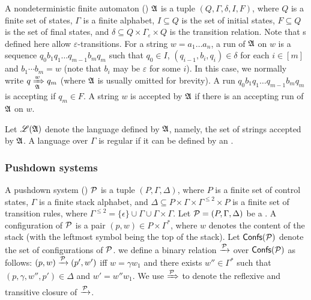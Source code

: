 
A nondeterministic finite automaton (\NFA) ${\mathfrak{A} }$ is a tuple $(Q, \Gamma, \delta, I, F)$, where $Q$ is a finite set of states, $\Gamma$ is a finite alphabet, $I \subseteq Q$ is the set of initial states, $F \subseteq Q$ is the set of final states, and $\delta \subseteq Q \times \Gamma_\varepsilon \times Q$ is the transition relation. Note that {\NFA}s defined here allow $\varepsilon$-transitions.
%
For a string $w = a_1 \dots a_n$, a run of ${\mathfrak{A} }$ on $w$ is a sequence $q_0 b_1q_1 \dots q_{m-1} b_m q_m$ such that $q_0 \in I$,  $(q_{i-1}, b_i, q_i) \in \delta$ for each $i \in [m]$ and $b_1 \cdots b_m = w$ (note that $b_i$ may be $\varepsilon$ for some $i$). In this case, we normally write $q \xRightarrow[{\mathfrak{A} }]{w} q_m$ 
(where ${\mathfrak{A} }$ is usually omitted %
for brevity).
%
A run $q_0 b_1q_1 \dots q_{m-1} b_m q_m$ is accepting if $q_m \in F$. A string $w$ is accepted by ${\mathfrak{A} }$ if there is an accepting run of ${\mathfrak{A} }$ on $w$. 

Let ${\mathscr{L} }({\mathfrak{A} })$ denote the language defined by ${\mathfrak{A} }$, namely, the set of strings accepted by ${\mathfrak{A} }$. 
A language over $\Gamma$ is regular if it can be defined by an \NFA.
 


\subsubsection{Pushdown systems}
A pushdown system ({\PDS}) ${\mathcal{P} }$ is a tuple $(P,\Gamma,\Delta)$, where $P$ is a finite set of control states, $\Gamma$ is a finite stack alphabet, and $\Delta\subseteq P\times\Gamma\times\Gamma^{\le 2}\times P$ is a finite set of transition rules, where $\Gamma^{\le 2} = \{\epsilon\}\cup\Gamma\cup\Gamma\times\Gamma$.
Let ${\mathcal{P} }=(P,\Gamma,\Delta)$ be a {\PDS}. A configuration of ${\mathcal{P} }$ is a pair $(p,w)\in P\times\Gamma^*$, where $w$ denotes the content of the stack (with the leftmost symbol being the top of the stack). Let ${\mathsf{Confs} }({\mathcal{P} })$ denote the set of configurations of ${\mathcal{P} }$. we define a binary relation $\xrightarrow{{\mathcal{P} }}$ over ${\mathsf{Confs} }({\mathcal{P} })$ as follows: $(p,w)\xrightarrow{{\mathcal{P} }}(p',w')$ iff $w = \gamma w_1$ and there exists $w''\in\Gamma^*$ such that $(p,\gamma,w'',p')\in\Delta$ and $w'=w''w_1$. We use $\xRightarrow{{\mathcal{P} }}$ to denote the reflexive and transitive closure of $\xrightarrow{{\mathcal{P} }}$.


